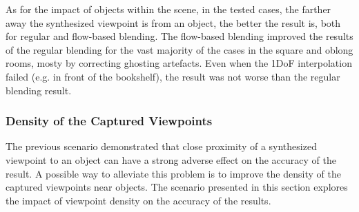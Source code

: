 As for the impact of objects within the scene, in the tested cases, the farther away the synthesized viewpoint is from an object, the better the result is, both for regular and flow-based blending. The flow-based blending improved the results of the regular blending for the vast majority of the cases in the square and oblong rooms, mosty by correcting ghosting artefacts. Even when the 1DoF interpolation failed (e.g. in front of the bookshelf), the result was not worse than the regular blending result.

























\subsubsection{Density of the Captured Viewpoints}
The previous scenario demonstrated that close proximity of a synthesized viewpoint to an object can have a strong adverse effect on the accuracy of the result. A possible way to alleviate this problem is to improve the density of the captured viewpoints near objects. The scenario presented in this section explores the impact of viewpoint density on the accuracy of the results.

